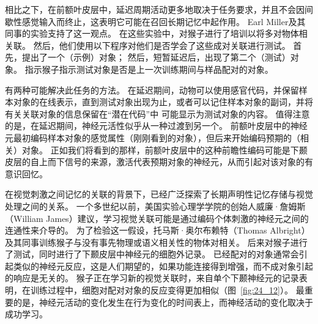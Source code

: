 相比之下，在前额叶皮层中，延迟周期活动更多地取决于任务要求，并且不会因间歇性感觉输入而终止，这表明它可能在召回长期记忆中起作用。
Earl Miller及其同事的实验支持了这一观点。
在这些实验中，对猴子进行了培训以将多对物体相关联。 
然后，他们使用以下程序对他们是否学会了这些成对关联进行测试。
首先，提出了一个（示例）对象； 然后，短暂延迟后，出现了第二个（测试）对象。
指示猴子指示测试对象是否是上一次训练期间与样品配对的对象。


有两种可能解决此任务的方法。
在延迟期间，动物可以使用感官代码，并保留样本对象的在线表示，直到测试对象出现为止，或者可以记住样本对象的副词，并将有关关联对象的信息保留在“潜在代码”中 可能显示为测试对象的内容。
值得注意的是，在延迟期间，神经元活性似乎从一种过渡到另一个。
前额叶皮层中的神经元最初编码样本对象的感觉属性（刚刚看到的对象），但后来开始编码预期的（相关）对象。 
正如我们将看到的那样，前额叶皮层中的这种前瞻性编码可能是下颞皮层的自上而下信号的来源，激活代表预期对象的神经元，从而引起对该对象的有意识回忆。


在视觉刺激之间记忆的关联的背景下，已经广泛探索了长期声明性记忆存储与视觉处理之间的关系。
一个多世纪以前，美国实验心理学学院的创始人威廉·詹姆斯（William James）建议，学习视觉关联可能是通过编码个体刺激的神经元之间的连通性来介导的。 为了检验这一假设，托马斯·奥尔布赖特（Thomas Albright）及其同事训练猴子与没有事先物理或语义相关性的物体对相关。
后来对猴子进行了测试，同时进行了下颞皮层中神经元的细胞外记录。
已经配对的对象通常会引起类似的神经元反应，这是人们期望的，如果功能连接得到增强，而不成对象引起的响应是无关的。
猴子正在学习新的视觉关联时，来自单个下颞神经元的记录表明，在训练过程中，细胞对配对对象的反应变得更加相似（图~\ref{fig:24_12}）。
最重要的是，神经元活动的变化发生在行为变化的时间表上，而神经活动的变化取决于成功学习。


